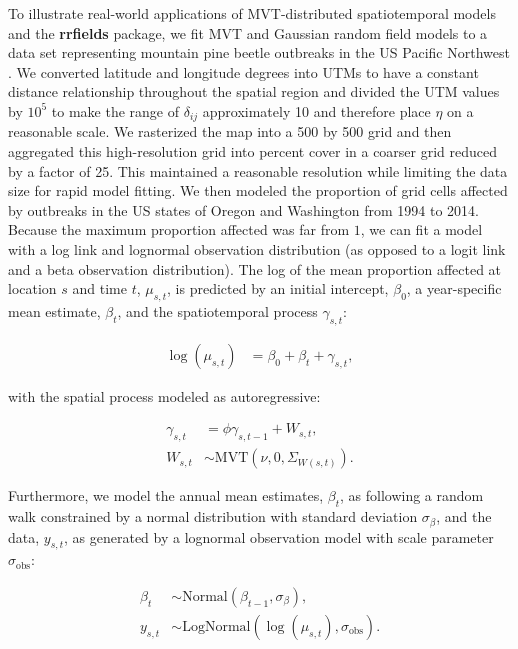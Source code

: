 \documentclass[12pt,english]{article}
\begin{document}
\begin{spacing}{1.3}
To illustrate real-world applications of MVT-distributed
spatiotemporal models and the \textbf{rrfields} package,
we fit MVT and Gaussian random field models
to a data set representing
mountain pine beetle outbreaks in the
US Pacific Northwest \citep{usdaforestservice2017}.
We converted latitude and longitude degrees into UTMs to have a constant
distance relationship throughout the spatial region and divided the UTM values
by $10^5$ to make the range of $\delta_{ij}$ approximately 10 and therefore
place $\eta$ on a reasonable scale.
We rasterized the map into a 500 by 500 grid
and then aggregated this high-resolution grid
into percent cover in a coarser grid reduced by a factor of 25.
This maintained a reasonable resolution
while limiting the data size for rapid model fitting.
We then modeled the
proportion of grid cells affected by outbreaks
in the US states of Oregon and Washington from 1994 to 2014.
Because the maximum proportion affected was far from $1$, we
can fit a model with a log link and lognormal observation distribution
(as opposed to a logit link and a beta observation distribution).
The log of the mean proportion affected at location $s$ and time $t$, $\mu_{s,t}$,
is predicted by an initial intercept, $\beta_0$, a year-specific mean estimate, $\beta_t$,
and the spatiotemporal process $\gamma_{s,t}$:

\begin{align}
  \log(\mu_{s,t}) &= \beta_0 + \beta_t + \gamma_{s,t},
  \end{align}

\noindent with the spatial process modeled as autoregressive:

\begin{align}
    \gamma_{s,t} &= \phi \gamma_{s,t-1} + W_{s,t},\\ \label{eq:beetle-mu}
     W_{s,t} &\sim \mathrm{MVT}\left(\nu, 0, \Sigma_{W(s,t)}\right).
 \end{align}

\noindent Furthermore, we model the annual
mean estimates, $\beta_t$, as following a random walk
constrained by a normal distribution with standard deviation $\sigma_{\beta}$,
and the data, $y_{s,t}$, as generated by a lognormal observation model
with scale parameter $\sigma_{\mathrm{obs}}$:

 \begin{align}
 \beta_t &\sim \mathrm{Normal}\left( \beta_{t-1}, \sigma_{\beta} \right),\\
  y_{s,t} &\sim \mathrm{LogNormal} \left(  \log(\mu_{s,t}), \sigma_{\mathrm{obs}} \right).
 \end{align}


\end{spacing}
\end{document}
